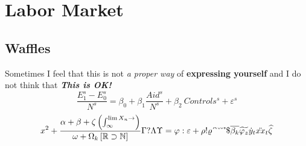 \documentclass{article}
\begin{document}
\displayoptions

\section{Labor Market}

\subsection{Waffles}
\label{sub:waffles}

Sometimes I feel that this is not \textit{a proper way} of \textbf{expressing yourself} and I do not think that \textbf{\textit{This is OK!}}
\begin{equation}
  \dfrac{E_1^s - E_0^s}{N^s}
  = \beta_0 + \beta_1 \dfrac{Aid^s}{N^s} + \beta_2 ~ Controls^s + \varepsilon^s
\end{equation}
\[
  x^2 + \dfrac{\alpha + \beta + \zeta \left(\int_{\infty}^{\lim X_n \to \empty}\right)}{\omega + \Omega_k \left[\mathbb{R} \supset \mathbb{N}\right]}
  \Gamma ? \Lambda\Upsilon = \varphi : \varepsilon + \rho ! \varrho
\acute ~ \grave ~ \breve ~ \check ~ \mathring ~ \mathdollar
\overline{\beta_k} \widetilde{\varphi_z} \dot{y}_t \ddot{xx}_t \widehat{\zeta}
\]

\end{document}
